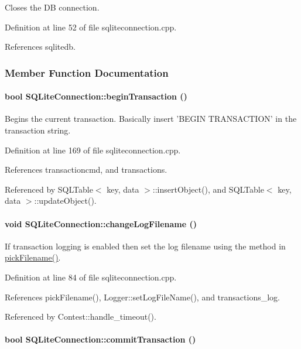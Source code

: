 Closes the DB connection. 

Definition at line 52 of file sqliteconnection.cpp.

References sqlitedb.

\subsubsection{Member Function Documentation}
\hypertarget{classSQLiteConnection_SQLiteConnectiona6}{
\paragraph[beginTransaction]{\setlength{\rightskip}{0pt plus 5cm}bool SQLite\-Connection::begin\-Transaction ()}\hfill}
\label{classSQLiteConnection_SQLiteConnectiona6}


Begins the current transaction. Basically insert 'BEGIN TRANSACTION' in the transaction string. 

Definition at line 169 of file sqliteconnection.cpp.

References transactioncmd, and transactions.

Referenced by SQLTable$<$ key, data $>$::insert\-Object(), and SQLTable$<$ key, data $>$::update\-Object().\hypertarget{classSQLiteConnection_SQLiteConnectiona16}{
\paragraph[changeLogFilename]{\setlength{\rightskip}{0pt plus 5cm}void SQLite\-Connection::change\-Log\-Filename ()}\hfill}
\label{classSQLiteConnection_SQLiteConnectiona16}


If transaction logging is enabled then set the log filename using the method in \hyperlink{classSQLiteConnection_SQLiteConnectiona15}{pick\-Filename()}. 

Definition at line 84 of file sqliteconnection.cpp.

References pick\-Filename(), Logger::set\-Log\-File\-Name(), and transactions\_\-log.

Referenced by Contest::handle\_\-timeout().\hypertarget{classSQLiteConnection_SQLiteConnectiona7}{
\paragraph[commitTransaction]{\setlength{\rightskip}{0pt plus 5cm}bool SQLite\-Connection::commit\-Transaction ()}\hfill}
\label{classSQLiteConnection_SQLiteConnectiona7}


